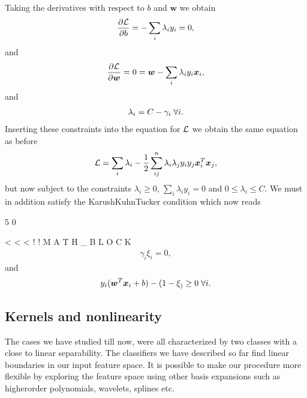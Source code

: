 \documentclass[letterpaper,10pt,english]{sphinxmanual}
\begin{document}
Taking the derivatives  with respect to \(b\) and \(\boldsymbol{w}\) we obtain
\begin{equation*}
\begin{split}
\frac{\partial {\cal L}}{\partial b} = -\sum_{i} \lambda_iy_i=0,
\end{split}
\end{equation*}
and
\begin{equation*}
\begin{split}
\frac{\partial {\cal L}}{\partial \boldsymbol{w}} = 0 = \boldsymbol{w}-\sum_{i} \lambda_iy_i\boldsymbol{x}_i,
\end{split}
\end{equation*}
and
\begin{equation*}
\begin{split}
\lambda_i = C-\gamma_i \hspace{0.1cm}\forall i.
\end{split}
\end{equation*}
Inserting these constraints into the equation for \({\cal L}\) we obtain the same equation as before
\begin{equation*}
\begin{split}
{\cal L}=\sum_i\lambda_i-\frac{1}{2}\sum_{ij}^n\lambda_i\lambda_jy_iy_j\boldsymbol{x}_i^T\boldsymbol{x}_j,
\end{split}
\end{equation*}
but now subject to the constraints \(\lambda_i\geq 0\), \(\sum_i\lambda_iy_i=0\) and \(0\leq\lambda_i \leq C\).
We must in addition satisfy the Karush\sphinxhyphen{}Kuhn\sphinxhyphen{}Tucker condition which now reads

5
0

\textless{}
\textless{}
\textless{}
!
!
M
A
T
H
\_
B
L
O
C
K
\begin{equation*}
\begin{split}
\gamma_i\xi_i = 0,
\end{split}
\end{equation*}
and
\begin{equation*}
\begin{split}
y_i(\boldsymbol{w}^T\boldsymbol{x}_i+b) -(1-\xi_) \geq 0 \hspace{0.1cm}\forall i.
\end{split}
\end{equation*}

\subsection{Kernels and non\sphinxhyphen{}linearity}
\label{\detokenize{chapter7:kernels-and-non-linearity}}
The cases we have studied till now, were all characterized by two classes
with a close to linear separability. The classifiers we have described
so far find linear boundaries in our input feature space. It is
possible to make our procedure more flexible by exploring the feature
space using other basis expansions such as higher\sphinxhyphen{}order polynomials,
wavelets, splines etc.
\end{document}
